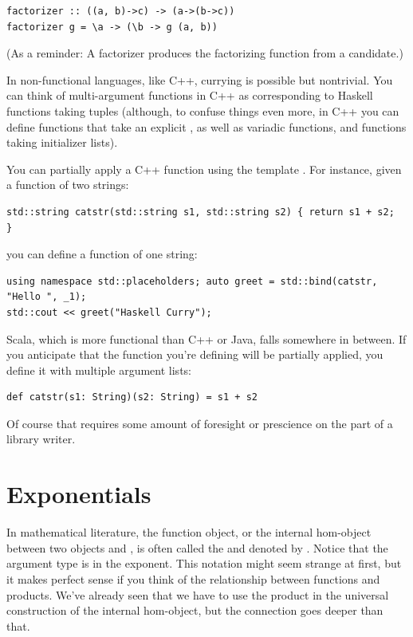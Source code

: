 \begin{verbatim}
factorizer :: ((a, b)->c) -> (a->(b->c))
factorizer g = \a -> (\b -> g (a, b))
\end{verbatim}

(As a reminder: A factorizer produces the factorizing function from a
candidate.)

In non-functional languages, like C++, currying is possible but
nontrivial. You can think of multi-argument functions in C++ as
corresponding to Haskell functions taking tuples (although, to confuse
things even more, in C++ you can define functions that take an explicit
, as well as variadic functions, and functions taking
initializer lists).

You can partially apply a C++ function using the template
. For instance, given a function of two strings:

\begin{verbatim}
std::string catstr(std::string s1, std::string s2) { return s1 + s2;
}
\end{verbatim}

you can define a function of one string:

\begin{verbatim}
using namespace std::placeholders; auto greet = std::bind(catstr, "Hello ", _1);
std::cout << greet("Haskell Curry");
\end{verbatim}

Scala, which is more functional than C++ or Java, falls somewhere in
between. If you anticipate that the function you're defining will be
partially applied, you define it with multiple argument lists:

\begin{verbatim}
def catstr(s1: String)(s2: String) = s1 + s2
\end{verbatim}

Of course that requires some amount of foresight or prescience on the
part of a library writer.

\section{Exponentials}\label{exponentials}

In mathematical literature, the function object, or the internal
hom-object between two objects  and , is often
called the  and denoted by . Notice that
the argument type is in the exponent. This notation might seem strange
at first, but it makes perfect sense if you think of the relationship
between functions and products. We've already seen that we have to use
the product in the universal construction of the internal hom-object,
but the connection goes deeper than that.

